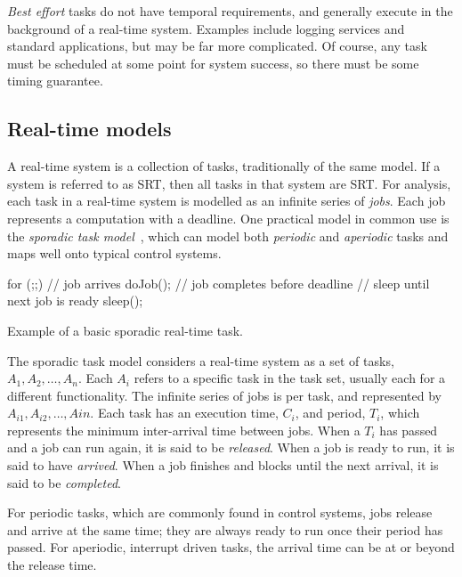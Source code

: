 \emph{Best effort} tasks do not have temporal requirements, and generally execute in the
background of a real-time system. Examples include logging services and standard applications, but
may be far more complicated. Of course, any task must be scheduled at some point for system success,
so there must be some timing guarantee. 

\subsection{Real-time models}

A real-time system is a collection of tasks, traditionally of the same model. If a system is
referred to as \gls{SRT}, then all tasks in that system are \gls{SRT}. For analysis, each task in a
real-time system is modelled as an infinite series of \emph{jobs}. Each job represents a computation
with a deadline. 
One practical model in common use is the \emph{sporadic task model}~\citep{Sprunt_SL_89a}, which can
model both \emph{periodic} and \emph{aperiodic} tasks and maps well onto typical control systems. 

\begin{listing}
    \begin{ccode}
for (;;) {
	// job arrives
	doJob();
	// job completes before deadline
    // sleep until next job is ready
    sleep();
}
    \end{ccode}
\caption{Example of a basic sporadic real-time task.}
\label{list:sporadic}
\end{listing}


The sporadic task model considers a real-time system as a set of tasks, $A_{1},A_{2},\ldots,A_{n}$.
Each $A_{i}$ refers to a specific task in the task set, usually each for a different functionality.
The infinite series of jobs is per task, and represented by $A_{i1},A_{i2},\ldots,A{in}$. Each task has
an execution time, $C_{i}$, and period, $T_{i}$, which represents the minimum inter-arrival time
between jobs. When a $T_{i}$ has passed and a job can run again, it is said to be \emph{released}.
When a job is ready to run, it is said to have \emph{arrived}. When a job finishes and blocks until
the next arrival, it is said to be \emph{completed}. 

For periodic tasks, which are commonly found in control systems, jobs release and arrive at the same
time; they are always ready to run once their period has passed. For aperiodic, \ie interrupt driven
tasks, the arrival time can be at or beyond the release time. 

